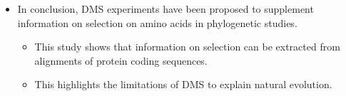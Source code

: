 \documentclass[12pt]{article}
\begin{document}
\begin{itemize}
	\item In conclusion, DMS experiments have been proposed to supplement information on selection on amino acids in phylogenetic studies.
	\begin{itemize}
		\item This study shows that information on selection can be extracted from alignments of protein coding sequences.
		\item This highlights the limitations of DMS to explain natural evolution.
	\end{itemize}
\end{itemize}
\end{document}
